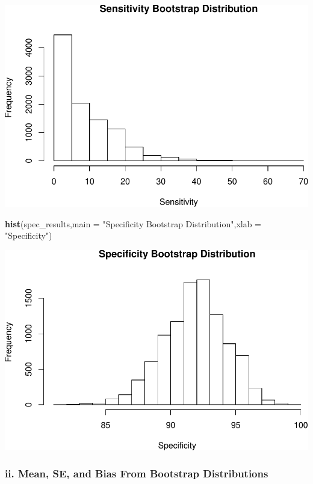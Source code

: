 \documentclass[]{article}
\newenvironment{Shaded}{\begin{snugshade}}{\end{snugshade}}
\newcommand{\DataTypeTok}[1]{\textcolor[rgb]{0.13,0.29,0.53}{#1}}
\newcommand{\KeywordTok}[1]{\textcolor[rgb]{0.13,0.29,0.53}{\textbf{#1}}}
\newcommand{\NormalTok}[1]{#1}
\newcommand{\StringTok}[1]{\textcolor[rgb]{0.31,0.60,0.02}{#1}}
\begin{document}
\includegraphics{QE2019_files/figure-latex/unnamed-chunk-6-1.pdf}

\begin{Shaded}
\begin{Highlighting}[]
\KeywordTok{hist}\NormalTok{(spec_results,}\DataTypeTok{main =} \StringTok{"Specificity Bootstrap Distribution"}\NormalTok{,}\DataTypeTok{xlab =} \StringTok{"Specificity"}\NormalTok{)}
\end{Highlighting}
\end{Shaded}

\includegraphics{QE2019_files/figure-latex/unnamed-chunk-6-2.pdf}

\hypertarget{ii.-mean-se-and-bias-from-bootstrap-distributions}{%
\subsubsection{ii. Mean, SE, and Bias From Bootstrap
Distributions}\label{ii.-mean-se-and-bias-from-bootstrap-distributions}}
\end{document}
